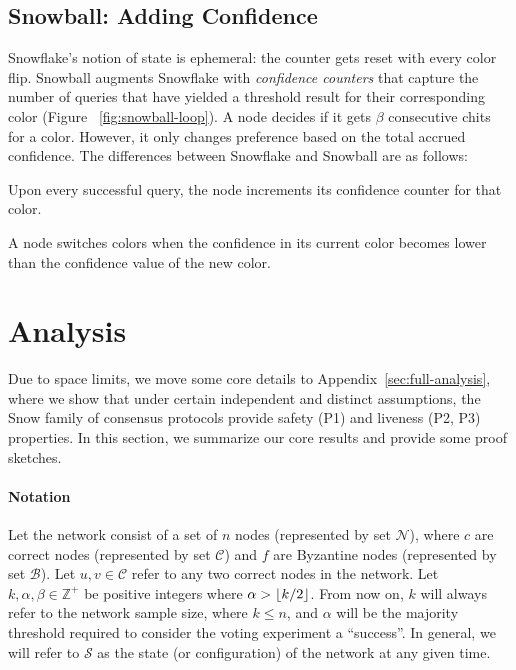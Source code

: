 \documentclass[letterpaper,twocolumn,10pt]{article}
\DeclarePairedDelimiter{\floor}{\lfloor}{\rfloor}
\theoremstyle{definition}
\begin{document}
\subsection{Snowball: Adding Confidence}

Snowflake's notion of state is ephemeral: the counter gets reset with every color flip.
Snowball augments Snowflake with \emph{confidence counters} that capture the number of queries that have yielded a threshold result for their corresponding color (Figure ~\ref{fig:snowball-loop}).
A node decides if it gets $\beta$ consecutive chits for a color. However, it only changes preference based on the total accrued confidence.
The differences between Snowflake and Snowball are as follows:
\begin{compactenum}
    \item Upon every successful query, the node increments its confidence counter for that color.
    \item A node switches colors when the confidence in its current color becomes lower than the confidence value of the new color.
\end{compactenum}


\section{Analysis}
\label{sec:analysis}
Due to space limits, we move some core details to Appendix~\ref{sec:full-analysis}, where we show that under certain independent and distinct assumptions, the Snow family of consensus protocols provide safety (P1) and liveness (P2, P3) properties.
In this section, we summarize our core results and provide some proof sketches.

\paragraph{Notation} Let the network consist of a set of $n$ nodes (represented by set $\mathcal{N}$), where $c$ are correct nodes (represented by set $\mathcal{C}$) and $f$ are Byzantine nodes (represented by set $\mathcal{B}$). 
Let $u, v \in \mathcal{C}$ refer to any two correct nodes in the network. Let $k, \alpha, \beta \in \mathbb{Z}^+$ be positive integers where $\alpha > \floor{k/2}$. From now on, $k$ will always refer to the network sample size, where $k \leq n$, and $\alpha$ will be the majority threshold required to consider the voting experiment a ``success''. In general, we will refer to $\mathcal{S}$ as the state (or configuration) of the network at any given time. 
\end{document}
